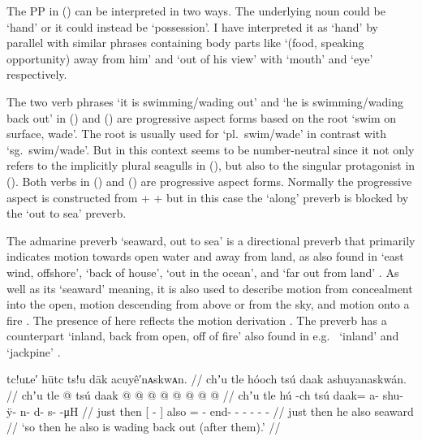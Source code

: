 The PP  in (\lastx) can be interpreted in two ways.
The underlying noun could be  ‘hand’ or it could instead be  ‘possession’.
I have interpreted it as  ‘hand’ by parallel with similar phrases containing body parts like  ‘(food, speaking opportunity) away from him’ and  ‘out of his view’ with  ‘mouth’ and  ‘eye’ respectively.

The two verb phrases  ‘it is swimming/wading out’ and  ‘he is swimming/wading back out’ in (\lastx) and (\nextx) are progressive aspect forms based on the root  ‘swim on surface, wade’.
The root  is usually used for ‘pl.\ swim/wade’ in contrast with  ‘sg.\ swim/wade’.
But in this context  seems to be number-neutral since it not only refers to the implicitly plural seagulls in (\lastx), but also to the singular protagonist in (\nextx).
Both verbs in (\lastx) and (\nextx) are progressive aspect forms.
Normally the progressive aspect is constructed from  +  +  but in this case the  ‘along’ preverb is blocked by the  ‘out to sea’ preverb.

The admarine preverb  ‘seaward, out to sea’ is a directional preverb that primarily indicates motion towards open water and away from land, as also found in  ‘east wind, offshore’,  ‘back of house’,  ‘out in the ocean’, and  ‘far out from land’ \parencite[05/65]{leer:1973}.
As well as its ‘seaward’ meaning, it is also used to describe motion from concealment into the open, motion descending from above or from the sky, and motion onto a fire \parencite[297]{leer:1991}.
The presence of  here reflects the motion derivation .
The  preverb has a counterpart  ‘inland, back from open, off of fire’ also found in e.g.\  ‘inland’ and  ‘jackpine’ \parencites[05/79–80]{leer:1973}[297]{leer:1991}.


\ex\label{ex:100-15-he-swimming-out}%
%
\begingl
	\glpreamble	tc!uʟe′ hūtc ts!u dāk acuyê′nᴀskwᴀn. //
	\glpreamble	chʼu tle hóoch tsú daak ashuyanaskwán. //
	\gla	chʼu tle {}  @ {} {} tsú
			daak @  @ {} @ {} @ {} @ {} @ {} @ {} @ {} //
	\glb	chʼu tle {} hú -ch {} tsú daak= a- shu- ÿ- n- d- s-  -μH //
	\glc	just then {}[  - {}] also
			= - end- - - - -  - //
	\gld	just then {} he {} {} also
			seaward  {} {} {} {} {} {} {} {} {} //
	\glft	‘so then he also is wading back out (after them).’
		//
\endgl
\xe

